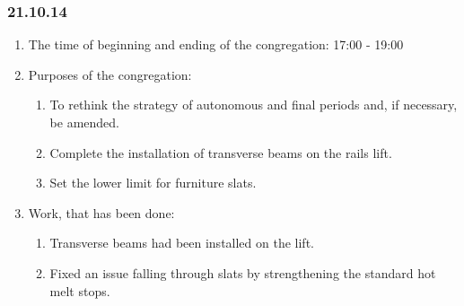 	
\subsubsection{21.10.14}

\begin{enumerate}
	\item The time of beginning and ending of the congregation:
	17:00 - 19:00
	\item Purposes of the congregation:
	\begin{enumerate}
	  \item To rethink the strategy of autonomous and final periods and, if necessary, be amended.
	  
	  \item Complete the installation of transverse beams on the rails lift.
	  
	  \item Set the lower limit for furniture slats.
	  
    \end{enumerate}
    
	\item Work, that has been done:
	\begin{enumerate}
	  \item Transverse beams had been installed on the lift.
      
      \item Fixed an issue falling through slats by strengthening the standard hot melt stops.
      

\end{enumerate}
\end{enumerate}
